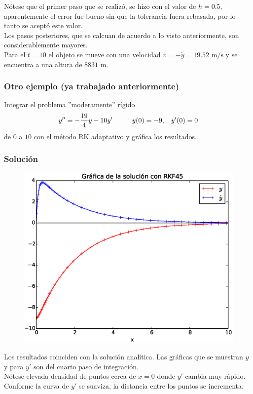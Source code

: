 \begin{frame}
Nótese que el primer paso que se realizó, se hizo con el valor de $h=0.5$, aparentemente el error fue bueno sin que la tolerancia fuera rebasada, por lo tanto se aceptó este valor.
\\
\medskip
Los pasos posteriores, que se calcuan de acuerdo a lo visto anteriormente, son considerablemente mayores.
\\
\medskip
Para el $t=10$ el objeto se mueve con una velocidad $v=-\dot{y}=19.52 \mbox{ m/s}$ y se encuentra a una altura de $8831 \mbox{ m}$.
\end{frame}
\begin{frame}
\frametitle{Otro ejemplo (ya trabajado anteriormente)}
Integrar el problema ''moderamente'' rígido
\[ y'' = -\dfrac{19}{4} y - 10 y' \hspace{1cm} y(0)=-9, \hspace{0.3cm} y'(0)=0 \]
de $0$ a $10$ con el método RK adaptativo y gráfica los resultados.
\end{frame}
\begin{frame}
\frametitle{Solución}
\begin{figure}
	\centering
	\includegraphics[scale=0.5]{Imagenes/MetodoRKF45.eps} 
\end{figure}
\end{frame}
\begin{frame}
Los resultados coinciden con la solución analítica. Las gráficas que se muestran $y$ y para $y'$ son del cuarto paso de integración.
\\
\medskip
Nótese elevada densidad de puntos cerca de $x=0$ donde $y'$ cambia muy rápido. Conforme la curva de $y'$ se suaviza, la distancia entre los puntos se incrementa.
\end{frame}
